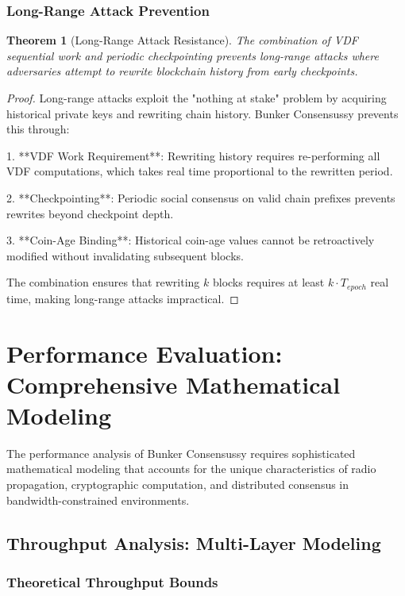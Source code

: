 \documentclass[11pt,a4paper]{article}
\newtheorem{theorem}{Theorem}[section]
\begin{document}
\subsubsection{Long-Range Attack Prevention}

\begin{theorem}[Long-Range Attack Resistance]
The combination of VDF sequential work and periodic checkpointing prevents long-range attacks where adversaries attempt to rewrite blockchain history from early checkpoints.
\end{theorem}

\begin{proof}
Long-range attacks exploit the "nothing at stake" problem by acquiring historical private keys and rewriting chain history. Bunker Consensussy prevents this through:

1. **VDF Work Requirement**: Rewriting history requires re-performing all VDF computations, which takes real time proportional to the rewritten period.

2. **Checkpointing**: Periodic social consensus on valid chain prefixes prevents rewrites beyond checkpoint depth.

3. **Coin-Age Binding**: Historical coin-age values cannot be retroactively modified without invalidating subsequent blocks.

The combination ensures that rewriting $k$ blocks requires at least $k \cdot T_{epoch}$ real time, making long-range attacks impractical.
\end{proof}

\section{Performance Evaluation: Comprehensive Mathematical Modeling}

The performance analysis of Bunker Consensussy requires sophisticated mathematical modeling that accounts for the unique characteristics of radio propagation, cryptographic computation, and distributed consensus in bandwidth-constrained environments.

\subsection{Throughput Analysis: Multi-Layer Modeling}

\subsubsection{Theoretical Throughput Bounds}
\end{document}
